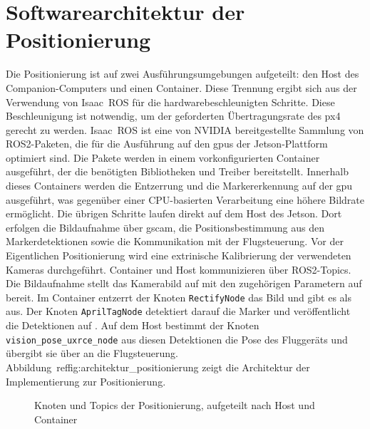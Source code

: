 \section{Softwarearchitektur der Positionierung}
\label{sec:softwarearchitektur_positionierung}
Die Positionierung ist auf zwei Ausführungsumgebungen aufgeteilt: den Host des Companion-Computers und einen Container.
Diese Trennung ergibt sich aus der Verwendung von Isaac~ROS für die hardwarebeschleunigten Schritte.
Diese Beschleunigung ist notwendig, um der geforderten Übertragungsrate des \gls{px4} gerecht zu werden. 
Isaac~ROS ist eine von NVIDIA bereitgestellte Sammlung von ROS2-Paketen, die für die Ausführung auf den \glspl{gpu} der Jetson-Plattform optimiert sind.
Die Pakete werden in einem vorkonfigurierten Container ausgeführt, der die benötigten Bibliotheken und Treiber bereitstellt.
Innerhalb dieses Containers werden die Entzerrung und die Markererkennung auf der \gls{gpu} ausgeführt, was gegenüber 
einer CPU-basierten Verarbeitung eine höhere Bildrate ermöglicht.
Die übrigen Schritte laufen direkt auf dem Host des Jetson.
Dort erfolgen die Bildaufnahme über gscam, die Positionsbestimmung aus den Markerdetektionen sowie die Kommunikation mit der Flugsteuerung.
Vor der Eigentlichen Positionierung wird eine extrinische Kalibrierung der verwendeten Kameras durchgeführt.
Container und Host kommunizieren über ROS2-Topics.
Die Bildaufnahme stellt das Kamerabild auf  mit den zugehörigen Parametern auf  bereit.
Im Container entzerrt der Knoten \texttt{RectifyNode} das Bild und gibt es als  aus.
Der Knoten \texttt{AprilTagNode} detektiert darauf die Marker und veröffentlicht die Detektionen auf .
Auf dem Host bestimmt der Knoten \texttt{vision\_pose\_uxrce\_node} aus diesen Detektionen die Pose des Fluggeräts und übergibt sie 
über  an die Flugsteuerung.
Abbildung~ref{fig:architektur_positionierung} zeigt die Architektur der Implementierung zur Positionierung.

\begin{figure}[htbp]
    \centering
    \caption{Knoten und Topics der Positionierung, aufgeteilt nach Host und Container}
    \label{fig:architektur_positionierung}
\end{figure}
\FloatBarrier





